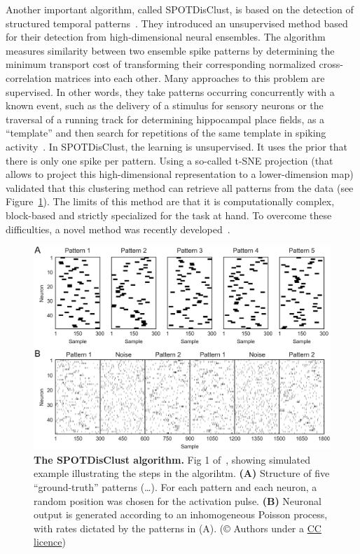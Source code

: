 \documentclass[brainsci, %
               review,submit,pdftex,moreauthors
               ]{Definitions/mdpi}
\begin{document}
Another important algorithm, called SPOTDisClust, is based on the detection of structured temporal patterns~\citep{grossberger_unsupervised_2018}. They introduced an unsupervised method based for their detection from high-dimensional neural ensembles. The algorithm measures similarity between two ensemble spike patterns by determining the minimum transport cost of transforming their corresponding normalized cross-correlation matrices into each other. Many approaches to this problem are supervised. In other words, they take patterns occurring concurrently with a known event, such as the delivery of a stimulus for sensory neurons or the traversal of a running track for determining hippocampal place fields, as a ``template'' and then search for repetitions of the same template in spiking activity~\citep{nadasdy_replay_1999,lee_combinatorial_2004}. In SPOTDisClust, the learning is unsupervised. It uses the prior that there is only one spike per pattern. Using a so-called t-SNE projection (that allows to project this high-dimensional representation to a lower-dimension map) validated that this clustering method can retrieve all patterns from the data (see Figure~\ref{fig:SPOTDisClust}). The limits of this method are that it is computationally complex, block-based and strictly specialized for the task at hand. To overcome these difficulties, a novel method was recently developed~\citep{sotomayor-gomez_spikeship_2021}.

\begin{figure}
\centering
\includegraphics[width=\linewidth]{figures/pcbi.1006283.g001.png}%
\caption{\textbf{The SPOTDisClust algorithm.} Fig 1 of~\citep{grossberger_unsupervised_2018}, showing simulated example illustrating the steps in the algorihtm. \textbf{(A)} Structure of five ``ground-truth'' patterns (\ldots). For each pattern and each neuron, a random position was chosen for the activation pulse. \textbf{(B)} Neuronal output is generated according to an inhomogeneous Poisson process, with rates dictated by the patterns in (A). (© Authors under a \href{https://journals.plos.org/ploscompbiol/article?id=10.1371/journal.pcbi.1006283}{CC licence})}\label{fig:SPOTDisClust}
\end{figure}
%
\end{document}
